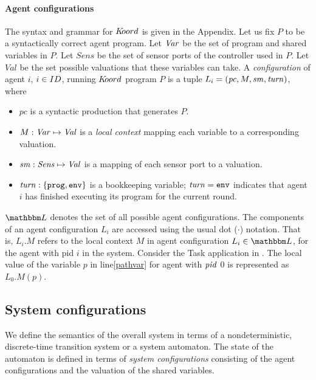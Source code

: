 \paragraph{Agent configurations}
The  syntax and grammar for $K\kern-2pt oord$ is given in the Appendix. 
Let us fix $P$ to be a syntactically correct agent program. Let $\mathit{Var}$ be the set of program and shared variables in $P$. Let $\mathit{Sens}$ be the set of sensor ports of the controller used in $P$. Let $\mathit{Val}$ be the set possible valuations that these variables can take. 
A {\em configuration\/} of agent $\mathit{i}$, $i \in ID$, running $K\kern-2pt oord$ program $P$ is a tuple $ L_i = (\mathit{pc}, {M},\mathit{sm},\mathit{turn})$, where
\begin{itemize}
 \item $\mathit{pc}$ is a syntactic production that generates $P$. 
\item ${M} : \mathit{Var} \mapsto \mathit{Val}$ is a {\em local context\/} mapping each variable to a corresponding valuation.
 \item $\mathit{sm} : \mathit{Sens} \mapsto \mathit{Val}$ is a mapping of each sensor port to a valuation.
 \item $\mathit{turn}:\{\mathtt{prog,env}\}$ is a bookkeeping variable; $\mathit{turn} = \mathtt{env}$ indicates that agent $i$ has finished executing its program for the current round.  
\end{itemize}
$\pwl$ denotes  the set of all possible agent configurations. The components of an agent configuration $L_i$ are accessed using the usual dot ($\cdot$) notation. That is, $L_i.M$ refers to the local context $M$ in agent configuration $L_i \in \pwl$, for the agent with pid $i$ in the system.  
%
%
Consider the Task application in . The local value of the variable $p$ in line\ref{pathvar} for agent with $\mathit{pid}$ 0 is represented as $L_0.M(p)$. 



\subsection{System configurations}

We define the semantics of the overall system in terms of a nondeterministic, discrete-time transition system or a system automaton. The state of the automaton is defined in terms of {\em system configurations\/} consisting of the agent configurations and the valuation of the shared variables. 

